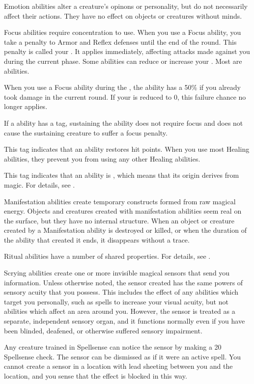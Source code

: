  Emotion abilities alter a creature's opinons or personality, but do not necessarily affect their actions.
They have no effect on objects or creatures without minds.

\label{Focus} Focus abilities require concentration to use.
When you use a Focus ability, you take a  penalty to Armor and Reflex defenses until the end of the round.
This penalty is called your .
It applies immediately, affecting attacks made against you during the current phase.
Some abilities can reduce or increase your .
Most  are  abilities.

When you use a Focus ability during the , the ability has a 50\%  if you already took damage in the current round.
If your  is reduced to 0, this failure chance no longer applies.

If a  ability has a  tag, sustaining the ability does not require focus and does not cause the sustaining creature to suffer a focus penalty.

 This tag indicates that an ability restores hit points.
When you use most Healing abilities, they  prevent you from using any other Healing abilities.

 This tag indicates that an ability is , which means that its origin derives from magic.
For details, see .

 Manifestation abilities create temporary constructs formed from raw magical energy.
Objects and creatures created with manifestation abilities seem real on the surface, but they have no internal structure.
When an object or creature created by a Manifestation ability is destroyed or killed, or when the duration of the ability that created it ends, it disappears without a trace.

 Ritual abilities have a number of shared properties.
For details, see .

 Scrying abilities create one or more invisible magical sensors that send you information.
Unless otherwise noted, the sensor created has the same powers of sensory acuity that you possess.
This includes the effect of any abilities which target you personally, such as spells to increase your visual acuity, but not abilities which affect an area around you.
However, the sensor is treated as a separate, independent sensory organ, and it functions normally even if you have been blinded, deafened, or otherwise suffered sensory impairment.
\par Any creature trained in Spellsense can notice the sensor by making a  20 Spellsense check.
The sensor can be dismissed as if it were an active spell.
You cannot create a sensor in a location with lead sheeting between you and the location, and you sense that the effect is blocked in this way.

